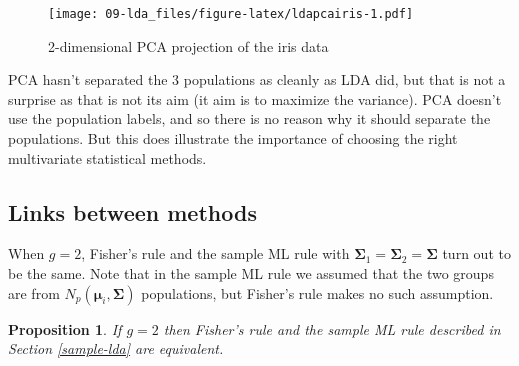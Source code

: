 \documentclass[
]{book}
\newenvironment{Shaded}{\begin{snugshade}}{\end{snugshade}}
\newcommand{\AttributeTok}[1]{\textcolor[rgb]{0.13,0.29,0.53}{#1}}
\newcommand{\DecValTok}[1]{\textcolor[rgb]{0.00,0.00,0.81}{#1}}
\newcommand{\FunctionTok}[1]{\textcolor[rgb]{0.13,0.29,0.53}{\textbf{#1}}}
\newcommand{\NormalTok}[1]{#1}
\newcommand{\OtherTok}[1]{\textcolor[rgb]{0.56,0.35,0.01}{#1}}
\newcommand{\SpecialCharTok}[1]{\textcolor[rgb]{0.81,0.36,0.00}{\textbf{#1}}}
\newtheorem{proposition}{Proposition}[chapter]
\theoremstyle{definition}
\theoremstyle{definition}
\theoremstyle{definition}
\theoremstyle{definition}
\theoremstyle{remark}
\begin{document}
\begin{Shaded}
\end{Shaded}

\begin{figure}
\centering
\texttt{[image: 09-lda\_files/figure-latex/ldapcairis-1.pdf]}
\caption{\label{fig:ldapcairis}2-dimensional PCA projection of the iris data}
\end{figure}

PCA hasn't separated the 3 populations as cleanly as LDA did, but that is not a surprise as that is not its aim (it aim is to maximize the variance). PCA doesn't use the population labels, and so there is no reason why it should separate the populations. But this does illustrate the importance of choosing the right multivariate statistical methods.

\hypertarget{links-between-methods}{%
\subsection{Links between methods}\label{links-between-methods}}

When \(g=2\), Fisher's rule and the sample ML rule with \(\boldsymbol{\Sigma}_1=\boldsymbol{\Sigma}_2=\boldsymbol{\Sigma}\) turn out to be the same. Note that in
the sample ML rule we assumed that the two groups are from \(N_p({\boldsymbol{\mu}}_i, \boldsymbol{\Sigma})\)
populations, but Fisher's rule makes no such assumption.

\begin{proposition}
\protect\hypertarget{prp:nine3}{}\label{prp:nine3}If \(g=2\) then Fisher's rule and the sample ML rule described in Section \ref{sample-lda} are equivalent.
\end{proposition}
\end{document}
